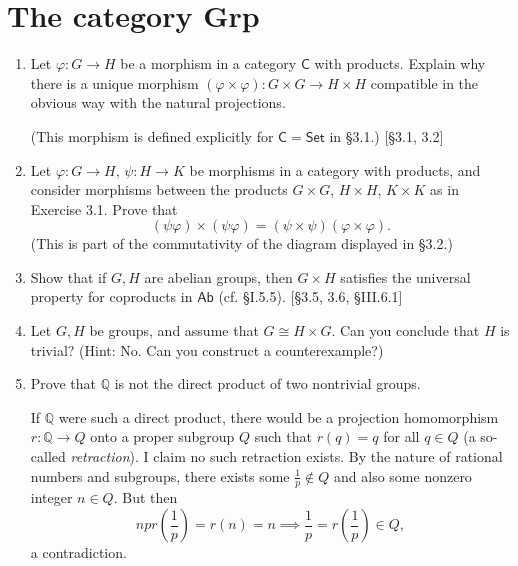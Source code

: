 \section{The category Grp}
\begin{enumerate}
      \item Let $\varphi: G \to H$ be a morphism in a category $\mathsf{C}$ with products. Explain why there is a unique morphism $(\varphi \times \varphi): G \times G \to H \times H$ compatible in the obvious way with the natural projections.

            (This morphism is defined explicitly for $\mathsf{C} = \mathsf{Set}$ in \S3.1.) [\S3.1, 3.2]

      \item Let $\varphi: G \to H$, $\psi: H \to K$ be morphisms in a category with products, and consider morphisms between the products $G \times G$, $H \times H$, $K \times K$ as in Exercise 3.1. Prove that
            \[ (\psi\varphi) \times (\psi\varphi) = (\psi \times \psi)(\varphi \times \varphi). \]
            (This is part of the commutativity of the diagram displayed in \S3.2.)

      \item Show that if $G, H$ are abelian groups, then $G \times H$ satisfies the universal property for coproducts in $\mathsf{Ab}$ (cf. \S I.5.5). [\S3.5, 3.6, \S III.6.1]

      \item Let $G, H$ be groups, and assume that $G \cong H \times G$. Can you conclude that $H$ is trivial? (Hint: No. Can you construct a counterexample?)

      \item Prove that $\mathbb{Q}$ is not the direct product of two nontrivial groups.
            \begin{solution}
                  If $\mathbb{Q}$ were such a direct product, there would be a projection homomorphism $r:\mathbb{Q} \to Q$ onto a proper subgroup $Q$ such that $r(q) = q$ for all  $q \in Q$ (a so-called \emph{retraction}). I claim no such retraction exists. By the nature of rational numbers and subgroups, there exists some $\frac1p \notin Q$ and also some nonzero integer $n \in Q$. But then \[ np r\left(\frac1p\right) = r(n) = n \implies \frac1p = r\left(\frac1p\right) \in Q,\] a contradiction.
            \end{solution}


\end{enumerate}
